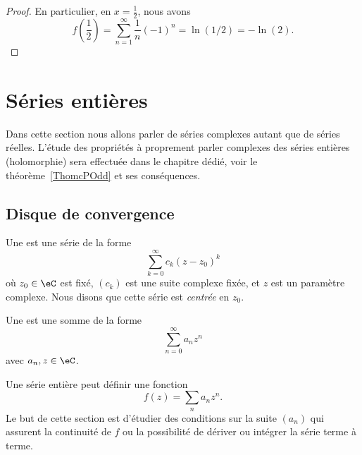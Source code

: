 \begin{proof}
	En particulier, en \( x=\frac{ 1 }{2}\), nous avons
	\begin{equation}
		f(\frac{ 1 }{2})=\sum_{n=1}^{\infty}\frac{1}{ n }(-1)^n=\ln(1/2)=-\ln(2).
	\end{equation}
\end{proof}

\section{Séries entières}

Dans cette section nous allons parler de séries complexes autant que de séries réelles. L'étude des propriétés à proprement parler complexes des séries entières (holomorphie) sera effectuée dans le chapitre dédié, voir le théorème~\ref{ThomcPOdd} et ses conséquences.

\subsection{Disque de convergence}

Une  est une série de la forme
\begin{equation}		\label{eqseriepuissance}
	\sum_{k=0}^{\infty}c_k(z-z_0)^k
\end{equation}
où \( z_0\in \eC\) est fixé, \( (c_k)\) est une suite complexe fixée, et \( z\) est un paramètre complexe. Nous disons que cette série est \emph{centrée} en \( z_0\).

\begin{definition}
	Une  est une somme de la forme
	\begin{equation}
		\sum_{n=0}^{\infty}a_nz^n
	\end{equation}
	avec \( a_n,z\in\eC\).
\end{definition}
Une série entière peut définir une fonction
\begin{equation}
	f(z)=\sum_na_nz^n.
\end{equation}
Le but de cette section est d'étudier des conditions sur la suite \( (a_n)\) qui assurent la continuité de \( f\) ou la possibilité de dériver ou intégrer la série terme à terme.

